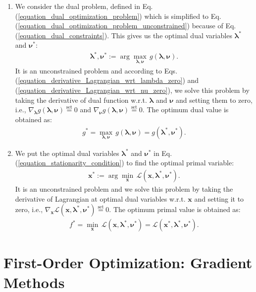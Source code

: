 \documentclass[lang=cn,10pt]{gorgeousnbook}
\numberwithin{equation}{section}%
\numberwithin{figure}{section}%
\begin{document}
\begin{enumerate}
\item We consider the dual problem, defined in Eq. (\ref{equation_dual_optimization_problem}) which is simplified to Eq. (\ref{equation_dual_optimization_problem_unconstrained}) because of Eq. (\ref{equation_dual_constraints}). This gives us the optimal dual variables $\boldsymbol{\lambda}^*$ and $\boldsymbol{\nu}^*$:
\begin{align}
\boldsymbol{\lambda}^*, \boldsymbol{\nu}^* := \arg \max_{\boldsymbol{\lambda}, \boldsymbol{\nu}}\, g(\boldsymbol{\lambda},\boldsymbol{\nu}). 
\end{align}
It is an unconstrained problem and according to Eqs. (\ref{equation_derivative_Lagrangian_wrt_lambda_zero}) and (\ref{equation_derivative_Lagrangian_wrt_nu_zero}), we solve this problem by taking the derivative of dual function w.r.t. $\boldsymbol{\lambda}$ and $\boldsymbol{\nu}$ and setting them to zero, i.e., $\nabla_{\boldsymbol{\lambda}}g(\boldsymbol{\lambda},\boldsymbol{\nu}) \overset{\text{set}}{=} 0$ and $\nabla_{\boldsymbol{\nu}}g(\boldsymbol{\lambda},\boldsymbol{\nu}) \overset{\text{set}}{=} 0$.
The optimum dual value is obtained as:
\begin{align}
g^* = \max_{\boldsymbol{\lambda}, \boldsymbol{\nu}}\, g(\boldsymbol{\lambda},\boldsymbol{\nu}) = g(\boldsymbol{\lambda}^*,\boldsymbol{\nu}^*).
\end{align}
\item We put the optimal dual variables $\boldsymbol{\lambda}^*$ and $\boldsymbol{\nu}^*$ in Eq. (\ref{equation_stationarity_condition}) to find the optimal primal variable:
\begin{align}
\boldsymbol{x}^* := \arg \min_{\boldsymbol{x}}\, \mathcal{L}(\boldsymbol{x},\boldsymbol{\lambda}^*,\boldsymbol{\nu}^*). 
\end{align}
It is an unconstrained problem and we solve this problem by taking the derivative of Lagrangian at optimal dual variables w.r.t. $\boldsymbol{x}$ and setting it to zero, i.e., $\nabla_{\boldsymbol{x}}\mathcal{L}(\boldsymbol{x},\boldsymbol{\lambda}^*,\boldsymbol{\nu}^*) \overset{\text{set}}{=} 0$.
The optimum primal value is obtained as:
\begin{align}
f^* = \min_{\boldsymbol{x}}\, \mathcal{L}(\boldsymbol{x},\boldsymbol{\lambda}^*,\boldsymbol{\nu}^*) = \mathcal{L}(\boldsymbol{x}^*,\boldsymbol{\lambda}^*,\boldsymbol{\nu}^*).
\end{align}
\end{enumerate}

\section{First-Order Optimization: Gradient Methods}\label{section_first_order_methods}
\end{document}
